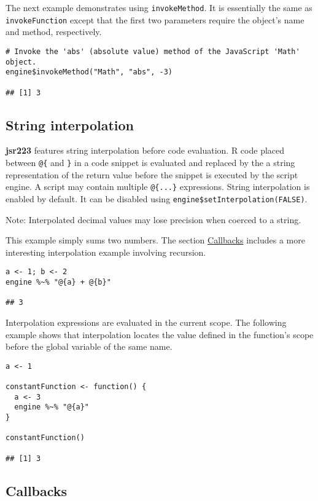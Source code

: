 \documentclass[
article,
11pt, %
a4paper, %
oneside, %
headinclude,footinclude, %
]{scrartcl}
\theoremstyle{definition} %
\theoremstyle{plain} %
\theoremstyle{remark} %
\newcommand{\pkg}[1]{\textbf{#1}}
\newcommand{\code}[1]{\texttt{#1}}
\newcommand{\strong}[1]{\texorpdfstring{{\normalfont\fontseries{b}\selectfont #1}}{#1}}
\begin{document}
The next example demonstrates using \code{invokeMethod}. It is essentially the same as \code{invokeFunction} except that the first two parameters require the object's name and method, respectively.

\begin{verbatim}
# Invoke the 'abs' (absolute value) method of the JavaScript 'Math' object.
engine$invokeMethod("Math", "abs", -3)

## [1] 3
\end{verbatim}

\hypertarget{string-interpolation}{}
\subsection{String interpolation}

\pkg{jsr223} features string interpolation before code evaluation. R code placed between \code{@\{} and \code{\}} in a code snippet is evaluated and replaced by the a string representation of the return value before the snippet is executed by the script engine. A script may contain multiple \code{@\{...\}} expressions. String interpolation is enabled by default. It can be disabled using \code{engine\$setInterpolation(FALSE)}.

\strong{Note:} Interpolated decimal values may lose precision when coerced to a string.

This example simply sums two numbers. The section \hyperlink{callbacks}{Callbacks} includes a more interesting interpolation example involving recursion.

\begin{verbatim}
a <- 1; b <- 2
engine %~% "@{a} + @{b}"

## 3
\end{verbatim}

Interpolation expressions are evaluated in the current scope. The following example shows that interpolation locates the value defined in the function's scope before the global variable of the same name.

\begin{verbatim}
a <- 1

constantFunction <- function() {
  a <- 3
  engine %~% "@{a}"
}

constantFunction()

## [1] 3
\end{verbatim}

\hypertarget{callbacks}{}
\subsection{Callbacks}
\end{document}
